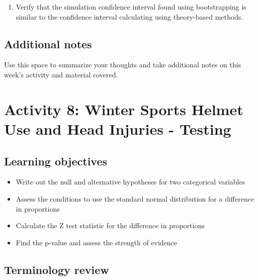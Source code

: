 \documentclass[
]{report}
\providecommand{\tightlist}{%
  \setlength{\itemsep}{0pt}\setlength{\parskip}{0pt}}
\begin{document}
\vspace{1in}

\begin{enumerate}
\def\labelenumi{\arabic{enumi}.}
\setcounter{enumi}{3}
\tightlist
\item
  Verify that the simulation confidence interval found using bootstrapping is similar to the confidence interval calculating using theory-based methods.
\end{enumerate}

\vspace{1in}

\hypertarget{additional-notes}{%
\section{Additional notes}\label{additional-notes}}

Use this space to summarize your thoughts and take additional notes on this week's activity and material covered.

\hypertarget{activity-8-winter-sports-helmet-use-and-head-injuries---testing}{%
\chapter{Activity 8: Winter Sports Helmet Use and Head Injuries - Testing}\label{activity-8-winter-sports-helmet-use-and-head-injuries---testing}}

\hypertarget{learning-objectives}{%
\section{Learning objectives}\label{learning-objectives}}

\begin{itemize}
\item
  Write out the null and alternative hypotheses for two categorical variables
\item
  Assess the conditions to use the standard normal distribution for a difference in proportions
\item
  Calculate the Z test statistic for the difference in proportions
\item
  Find the p-value and assess the strength of evidence
\end{itemize}

\hypertarget{terminology-review}{%
\section{Terminology review}\label{terminology-review}}
\end{document}
